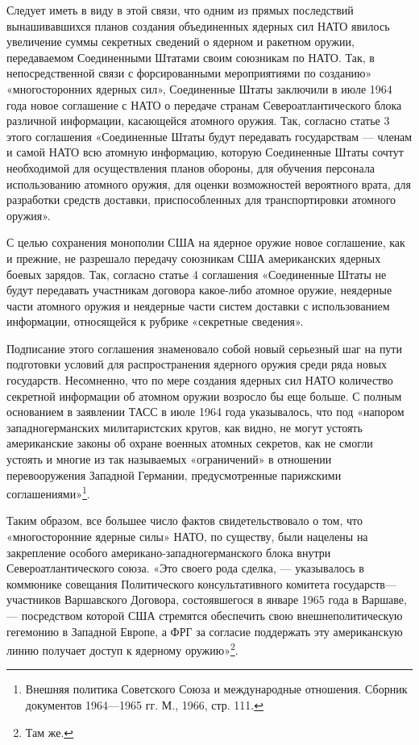 \documentclass[12pt, a4paper, openany]{book}
\begin{document}
	Следует иметь в виду в этой связи, что одним из прямых последствий вынашивавшихся планов создания объединенных ядерных сил НАТО явилось увеличение суммы секретных сведений о ядерном и ракетном оружии, передаваемом Соединенными Штатами своим союзникам по НАТО. Так, в непосредственной связи с форсированными мероприятиями по созданию» «многосторонних ядерных сил», Соединенные Штаты заключили в июле 1964 года новое соглашение с НАТО о передаче странам Североатлантического блока различной информации, касающейся атомного оружия. Так, согласно статье 3 этого соглашения «Соединенные Штаты будут передавать государствам — членам и самой НАТО всю атомную информацию, которую Соединенные Штаты сочтут необходимой для осуществления планов обороны, для обучения персонала использованию атомного оружия, для оценки возможностей вероятного врата, для разработки средств доставки, приспособленных для транспортировки атомного оружия».
	
	С целью сохранения монополии США на ядерное оружие новое соглашение, как и прежние, не разрешало передачу союзникам США американских ядерных боевых зарядов. Так, согласно статье 4 соглашения «Соединенные Штаты не будут передавать участникам договора какое-либо атомное оружие, неядерные части атомного оружия и неядерные части систем доставки с использованием информации, относящейся к рубрике «секретные сведения».
	
	Подписание этого соглашения знаменовало собой новый серьезный шаг на пути подготовки условий для распространения ядерного оружия среди ряда новых государств. Несомненно, что по мере создания ядерных сил НАТО количество секретной информации об атомном оружии возросло бы еще больше. С полным основанием в заявлении ТАСС в июле 1964 года указывалось, что под «напором западногерманских милитаристских кругов, как видно, не могут устоять американские законы об охране военных атомных секретов, как не смогли устоять и многие из так называемых «ограничений» в отношении перевооружения Западной Германии, предусмотренные парижскими соглашениями»{\footnote{Внешняя политика Советского Союза и международные отношения. Сборник документов 1964—1965 гг. М., 1966, стр. 111.
	}}.
	
	Таким образом, все большее число фактов свидетельствовало о том, что «многосторонние ядерные силы» НАТО, по существу, были нацелены на закрепление особого американо-западногерманского блока внутри Североатлантического союза. «Это своего рода сделка, — указывалось в коммюнике совещания Политического консультативного комитета государств—участников Варшавского Договора, состоявшегося в январе 1965 года в Варшаве, — посредством которой США стремятся обеспечить свою внешнеполитическую гегемонию в Западной Европе, а ФРГ за согласие поддержать эту американскую линию получает доступ к ядерному оружию»{\footnote{Там же.}}.
	
\end{document}
